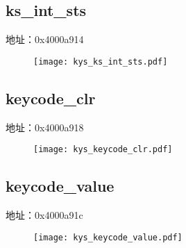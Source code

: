 \subsection{ks\_int\_sts}
\label{kys-ks-int-sts}
地址：0x4000a914
 \begin{figure}[H]
\texttt{[image: kys\_ks\_int\_sts.pdf]}
\end{figure}

\subsection{keycode\_clr}
\label{kys-keycode-clr}
地址：0x4000a918
 \begin{figure}[H]
\texttt{[image: kys\_keycode\_clr.pdf]}
\end{figure}

\subsection{keycode\_value}
\label{kys-keycode-value}
地址：0x4000a91c
 \begin{figure}[H]
\texttt{[image: kys\_keycode\_value.pdf]}
\end{figure}


